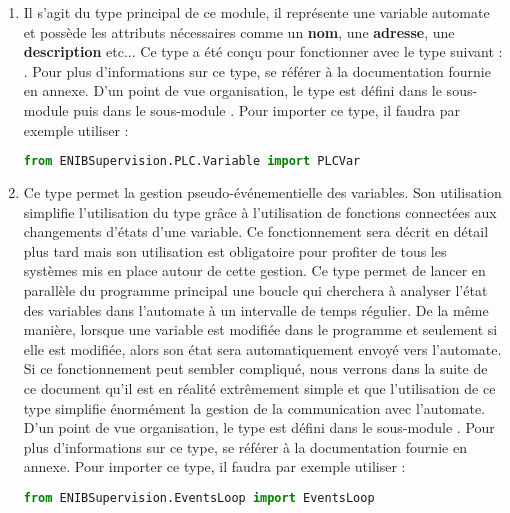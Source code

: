 \begin{enumerate}

\item \label{tag-presentation-PLCVar}  \newline
Il s'agit du type principal de ce module, il représente une variable automate et possède les attributs nécessaires comme un \textbf{nom}, une \textbf{adresse}, une \textbf{description} etc... Ce type a été conçu pour fonctionner avec le type suivant : .\newline
Pour plus d'informations sur ce type, se référer à la documentation fournie en annexe.\newline
D'un point de vue organisation, le type  est défini dans le sous-module  puis dans le sous-module . \newline
Pour importer ce type, il faudra par exemple utiliser :
\begin{lstlisting}[language=Python]
from ENIBSupervision.PLC.Variable import PLCVar
\end{lstlisting}

\item {} \newline
Ce type permet la gestion pseudo-événementielle des variables. Son utilisation simplifie l'utilisation du type  grâce à l'utilisation de fonctions connectées aux changements d'états d'une variable. Ce fonctionnement sera décrit en détail plus tard mais son utilisation est obligatoire pour profiter de tous les systèmes mis en place autour de cette gestion.\newline
Ce type permet de lancer en parallèle du programme principal une boucle qui cherchera à analyser l'état des variables dans l'automate à un intervalle de temps régulier. De la même manière, lorsque une variable est modifiée dans le programme et seulement si elle est modifiée, alors son état sera automatiquement envoyé vers l'automate. \newline
Si ce fonctionnement peut sembler compliqué, nous verrons dans la suite de ce document qu'il est en réalité extrêmement simple et que l'utilisation de ce type simplifie énormément la gestion de la communication avec l'automate. \newline
D'un point de vue organisation, le type  est défini dans le sous-module .\newline
Pour plus d'informations sur ce type, se référer à la documentation fournie en annexe.\newline
Pour importer ce type, il faudra par exemple utiliser :
\begin{lstlisting}[language=Python]
from ENIBSupervision.EventsLoop import EventsLoop
\end{lstlisting}


\end{enumerate}
